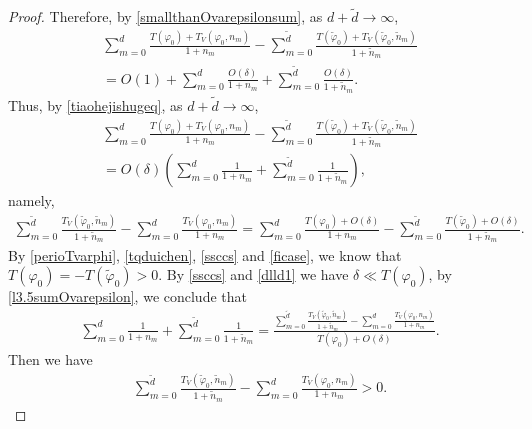 \documentclass[12pt]{amsart}
\theoremstyle{plain}
\theoremstyle{definition}
\begin{document}
\begin{proof}
		Therefore, by \eqref{smallthanOvarepsilonsum}, as $d+\tilde{d}\to\infty$,
		\begin{align}
			\sum_{m=0}^{d}\frac{T(\varphi_0)+T_V(\varphi_0,n_{m})}{1+n_{m}}-\sum_{m=0}^{\tilde{d}}\frac{T(\tilde{\varphi}_0)+T_V(\tilde{\varphi}_0,\tilde{n}_{m})}{1+\tilde{n}_{m}}\nonumber\\
			=O(1)+ \sum_{m=0}^{d}\frac{O(\delta)}{1+n_{m}}+\sum_{m=0}^{\tilde{d}}\frac{O(\delta)}{1+\tilde{n}_{m}}.\nonumber
		\end{align}
		Thus, by \eqref{tiaohejishugeq}, as $d+\tilde{d}\to\infty$,
		\begin{align}
		\sum_{m=0}^{d}\frac{T(\varphi_0)+T_V(\varphi_0,n_{m})}{1+n_{m}}-\sum_{m=0}^{\tilde{d}}\frac{T(\tilde{\varphi}_0)+T_V(\tilde{\varphi}_0,\tilde{n}_{m})}{1+\tilde{n}_{m}}\nonumber\\
			=O(\delta)\left( \sum_{m=0}^{d}\frac{1}{1+n_{m}}+\sum_{m=0}^{\tilde{d}}\frac{1}{1+\tilde{n}_{m}}\right),\nonumber
		\end{align}
		namely,
		\begin{align}
			\label{l3.5sumOvarepsilon}\sum_{m=0}^{\tilde{d}}\frac{T_V(\tilde{\varphi}_0,\tilde{n}_{m})}{1+\tilde{n}_{m}}-\sum_{m=0}^{d}\frac{T_V(\varphi_0,n_{m})}{1+n_{m}}=\sum_{m=0}^{d}\frac{T(\varphi_0)+O(\delta)}{1+n_{m}}-\sum_{m=0}^{\tilde{d}}\frac{T(\tilde{\varphi}_0)+O(\delta)}{1+\tilde{n}_{m}}.
		\end{align}
		By \eqref{perioTvarphi}, \eqref{tqduichen}, \eqref{ssccs} and \eqref{ficase}, we know that $T(\varphi_0)=-T(\tilde{\varphi}_0)>0$. By \eqref{ssccs} and \eqref{dlld1} we have $\delta\ll T(\varphi_0)$,  by \eqref{l3.5sumOvarepsilon}, we conclude that
		\begin{align}
			 \sum_{m=0}^{d}\frac{1}{1+n_{m}}+\sum_{m=0}^{\tilde{d}}\frac{1}{1+\tilde{n}_{m}}=\frac{\sum_{m=0}^{\tilde{d}}\frac{T_V(\tilde{\varphi}_0,\tilde{n}_{m})}{1+\tilde{n}_{m}}-\sum_{m=0}^{d}\frac{T_V(\varphi_0,n_{m})}{1+n_{m}}}{T(\varphi_0)+O(\delta)}.\label{l3.5denominator}
		\end{align}
Then we have
\begin{align}
	{\sum_{m=0}^{\tilde{d}}\frac{T_V(\tilde{\varphi}_0,\tilde{n}_{m})}{1+\tilde{n}_{m}}-\sum_{m=0}^{d}\frac{T_V(\varphi_0,n_{m})}{1+n_{m}}}>0.\label{denominator>0}
\end{align}
		

\end{proof}
\end{document}
